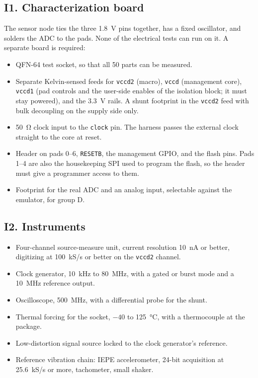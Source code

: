 \documentclass[10pt]{article}
\begin{document}
\subsection*{I1. Characterization board}
The sensor node ties the three \SI{1.8}{\volt} pins together, has a fixed
oscillator, and solders the ADC to the pads. None of the electrical tests
can run on it. A separate board is required:
\begin{itemize}
\item QFN-64 test socket, so that all 50 parts can be measured.
\item Separate Kelvin-sensed feeds for \texttt{vccd2} (macro), \texttt{vccd}
(management core), \texttt{vccd1} (pad controls and the user-side enables
of the isolation block; it must stay powered), and the \SI{3.3}{\volt}
rails. A shunt footprint in the \texttt{vccd2} feed with bulk decoupling
on the supply side only.
\item \SI{50}{\ohm} clock input to the \texttt{clock} pin. The harness
passes the external clock straight to the core at reset.
\item Header on pads 0--6, \texttt{RESETB}, the management GPIO, and the
flash pins. Pads 1--4 are also the housekeeping SPI used to program the
flash, so the header must give a programmer access to them.
\item Footprint for the real ADC and an analog input, selectable against
the emulator, for group D.
\end{itemize}

\subsection*{I2. Instruments}
\begin{itemize}
\item Four-channel source-measure unit, current resolution \SI{10}{\nano\ampere}
or better, digitizing at \SI{100}{kS/s} or better on the \texttt{vccd2} channel.
\item Clock generator, \SI{10}{\kilo\hertz} to \SI{80}{\mega\hertz}, with a
gated or burst mode and a \SI{10}{\mega\hertz} reference output.
\item Oscilloscope, \SI{500}{\mega\hertz}, with a differential probe for the shunt.
\item Thermal forcing for the socket, $-40$ to \SI{125}{\celsius}, with a
thermocouple at the package.
\item Low-distortion signal source locked to the clock generator's reference.
\item Reference vibration chain: IEPE accelerometer, 24-bit acquisition at
\SI{25.6}{kS/s} or more, tachometer, small shaker.
\end{itemize}
\end{document}
